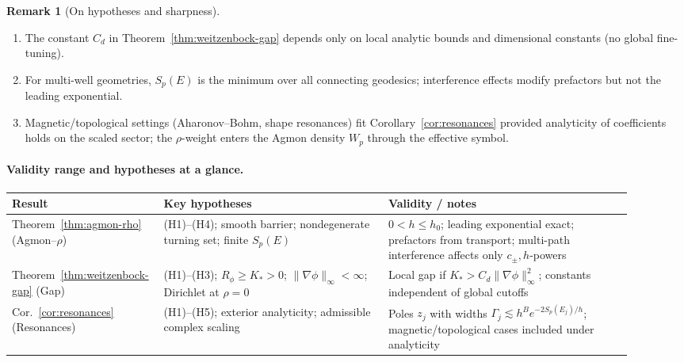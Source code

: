 \documentclass[11pt]{article}
\theoremstyle{definition}
\newtheorem{remark}[theorem]{Remark}
\begin{document}
	\begin{remark}[On hypotheses and sharpness]
		\leavevmode
		\begin{enumerate}
			\item The constant $C_d$ in Theorem~\ref{thm:weitzenbock-gap} depends only on local analytic bounds and dimensional constants (no global fine-tuning).
			\item For multi-well geometries, $S_p(E)$ is the minimum over all connecting geodesics; interference effects modify prefactors but not the leading exponential.
			\item Magnetic/topological settings (Aharonov--Bohm, shape resonances) fit Corollary~\ref{cor:resonances} provided analyticity of coefficients holds on the scaled sector; the $\rho$-weight enters the Agmon density $W_p$ through the effective symbol.
		\end{enumerate}
	\end{remark}
	
	\paragraph{Validity range and hypotheses at a glance.}
	\begin{center}
		\small
		\begin{tabular}{p{0.18\linewidth} p{0.35\linewidth} p{0.38\linewidth}}
			\toprule
			\textbf{Result} & \textbf{Key hypotheses} & \textbf{Validity / notes} \\
			\midrule
			Theorem~\ref{thm:agmon-rho} (Agmon--$\rho$) 
			& (H1)--(H4); smooth barrier; nondegenerate turning set; finite $S_p(E)$
			& $0<h\le h_0$; leading exponential exact; prefactors from transport; multi-path interference affects only $c_\pm,h$-powers \\[4pt]
			Theorem~\ref{thm:weitzenbock-gap} (Gap)
			& (H1)--(H3); $R_\phi\ge K_\ast>0$; $\|\nabla\phi\|_\infty<\infty$; Dirichlet at $\rho=0$
			& Local gap if $K_\ast>C_d\|\nabla\phi\|_\infty^2$; constants independent of global cutoffs \\[4pt]
			Cor.~\ref{cor:resonances} (Resonances)
			& (H1)--(H5); exterior analyticity; admissible complex scaling
			& Poles $z_j$ with widths $\Gamma_j\lesssim h^{B}e^{-2S_p(E_j)/h}$; magnetic/topological cases included under analyticity \\
			\bottomrule
		\end{tabular}
	\end{center}


    
\end{document}
